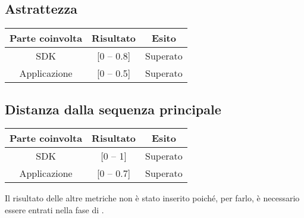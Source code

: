\subsection{Astrattezza}

\begin{center}
	\begin{tabular}{|c|c|c|}
	\hline
	\textbf{Parte coinvolta} & \textbf{Risultato} & \textbf{Esito} \\
	\hline
	SDK & [0 -- 0.8] & Superato \\
	\hline
	Applicazione & [0 -- 0.5] & Superato \\
	\hline
	\end{tabular}
\end{center}

\subsection{Distanza dalla sequenza principale}

\begin{center}
	\begin{tabular}{|c|c|c|}
	\hline
	\textbf{Parte coinvolta} & \textbf{Risultato} & \textbf{Esito} \\
	\hline
	SDK & [0 -- 1] & Superato \\
	\hline
	Applicazione & [0 -- 0.7] & Superato \\
	\hline
	\end{tabular}
\end{center}

Il risultato delle altre metriche non è stato inserito poiché, per farlo, è necessario essere entrati nella fase di \COD.
